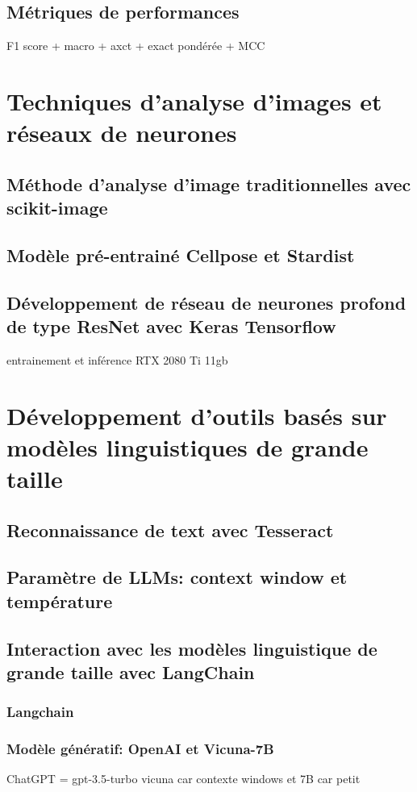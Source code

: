 \subsection{Métriques de performances}
F1 score + macro + axct + exact pondérée + MCC

\section{Techniques d'analyse d'images et réseaux de neurones}
\subsection{Méthode d'analyse d'image traditionnelles avec scikit-image}

\subsection{Modèle pré-entrainé Cellpose et Stardist}
\subsection{Développement de réseau de neurones profond de type ResNet avec Keras Tensorflow}
entrainement et inférence RTX 2080 Ti 11gb

\section{Développement d'outils basés sur modèles linguistiques de grande taille}
\subsection{Reconnaissance de text avec Tesseract}
\subsection{Paramètre de LLMs: context window et température}
\subsection{Interaction avec les modèles linguistique de grande taille avec LangChain}
\subsubsection{Langchain}
\subsubsection{Modèle génératif: OpenAI et Vicuna-7B}
ChatGPT = gpt-3.5-turbo
vicuna car contexte windows et 7B car petit
